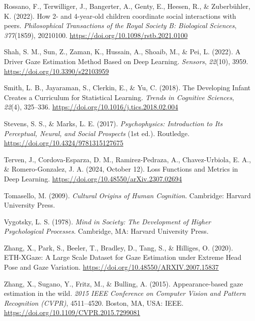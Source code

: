 \documentclass[
  man,floatsintext]{apa6}
\newlength{\cslhangindent}
\newenvironment{CSLReferences}[2] %
 {\begin{list}{}{%
  \setlength{\itemindent}{0pt}
  \setlength{\leftmargin}{0pt}
  \setlength{\parsep}{0pt}
  \ifodd #1
   \setlength{\leftmargin}{\cslhangindent}
   \setlength{\itemindent}{-1\cslhangindent}
  \fi
  \setlength{\itemsep}{#2\baselineskip}}}
 {\end{list}}
\begin{document}
\begin{CSLReferences}{1}{0}
Rossano, F., Terwilliger, J., Bangerter, A., Genty, E., Heesen, R., \& Zuberbühler, K. (2022). How 2- and 4-year-old children coordinate social interactions with peers. \emph{Philosophical Transactions of the Royal Society B: Biological Sciences}, \emph{377}(1859), 20210100. \url{https://doi.org/10.1098/rstb.2021.0100}

Shah, S. M., Sun, Z., Zaman, K., Hussain, A., Shoaib, M., \& Pei, L. (2022). A {Driver Gaze Estimation Method Based} on {Deep Learning}. \emph{Sensors}, \emph{22}(10), 3959. \url{https://doi.org/10.3390/s22103959}

Smith, L. B., Jayaraman, S., Clerkin, E., \& Yu, C. (2018). The {Developing Infant Creates} a {Curriculum} for {Statistical Learning}. \emph{Trends in Cognitive Sciences}, \emph{22}(4), 325--336. \url{https://doi.org/10.1016/j.tics.2018.02.004}

Stevens, S. S., \& Marks, L. E. (2017). \emph{Psychophysics: {Introduction} to {Its Perceptual}, {Neural}, and {Social Prospects}} (1st ed.). Routledge. \url{https://doi.org/10.4324/9781315127675}

Terven, J., Cordova-Esparza, D. M., Ramirez-Pedraza, A., Chavez-Urbiola, E. A., \& Romero-Gonzalez, J. A. (2024, October 12). Loss {Functions} and {Metrics} in {Deep Learning}. \url{https://doi.org/10.48550/arXiv.2307.02694}

Tomasello, M. (2009). \emph{Cultural {Origins} of {Human Cognition}}. Cambridge: Harvard University Press.

Vygotsky, L. S. (1978). \emph{Mind in {Society}: {The Development} of {Higher Psychological Processes}}. Cambridge, MA: Harvard University Press.

Zhang, X., Park, S., Beeler, T., Bradley, D., Tang, S., \& Hilliges, O. (2020). {ETH-XGaze}: {A Large Scale Dataset} for {Gaze Estimation} under {Extreme Head Pose} and {Gaze Variation}. \url{https://doi.org/10.48550/ARXIV.2007.15837}

Zhang, X., Sugano, Y., Fritz, M., \& Bulling, A. (2015). Appearance-based gaze estimation in the wild. \emph{2015 {IEEE Conference} on {Computer Vision} and {Pattern Recognition} ({CVPR})}, 4511--4520. Boston, MA, USA: IEEE. \url{https://doi.org/10.1109/CVPR.2015.7299081}


\end{CSLReferences}
\end{document}
